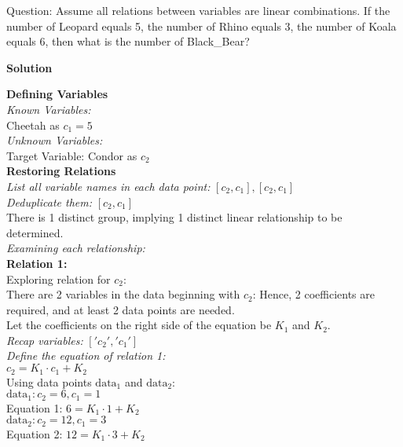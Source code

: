 Question:
Assume all relations between variables are linear combinations. If the number of Leopard equals 5, the number of Rhino equals 3, the number of Koala equals 6, then what is the number of Black\_Bear?

\textbf{Solution\:}

\textbf{Defining Variables} \\
\textit{Known Variables:} \\
Cheetah as \( c_1 = 5 \) \\

\textit{Unknown Variables:} \\
Target Variable: Condor as \( c_2 \) \\

\textbf{Restoring Relations} \\
\textit{List all variable names in each data point:} \([c_2, c_1], [c_2, c_1]\) \\
\textit{Deduplicate them:} \([c_2, c_1]\) \\
There is 1 distinct group, implying 1 distinct linear relationship to be determined. \\
\textit{Examining each relationship:} \\

\textbf{Relation 1:} \\
Exploring relation for \( c_2 \): \\
There are 2 variables in the data beginning with \( c_2 \): Hence, 2 coefficients are required, and at least 2 data points are needed. \\

Let the coefficients on the right side of the equation be \( K_1 \) and \( K_2 \). \\
\textit{Recap variables:} \(['c_2', 'c_1']\) \\
\textit{Define the equation of relation 1:} \\
\( c_2 = K_1 \cdot c_1 + K_2 \) \\

Using data points \( \text{data}_1 \) and \( \text{data}_2 \): \\
\( \text{data}_1: c_2 = 6, c_1 = 1 \) \\
Equation 1: \( 6 = K_1 \cdot 1 + K_2 \) \\
\( \text{data}_2: c_2 = 12, c_1 = 3 \) \\
Equation 2: \( 12 = K_1 \cdot 3 + K_2 \) \\


